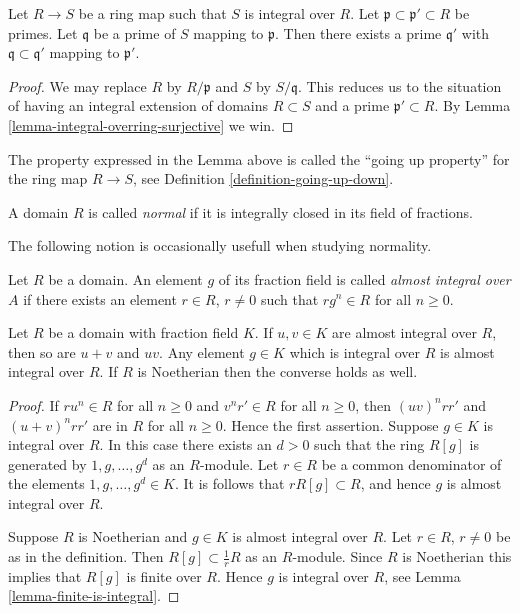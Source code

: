 \begin{lemma}
\label{lemma-integral-going-up}
Let $R \to S$ be a ring map such that
$S$ is integral over $R$.
Let $\mathfrak p \subset \mathfrak p' \subset R$
be primes. Let $\mathfrak q$ be a prime of $S$ mapping
to $\mathfrak p$. Then there exists a prime $\mathfrak q'$
with $\mathfrak q \subset \mathfrak q'$
mapping to $\mathfrak p'$.
\end{lemma}

\begin{proof}
We may replace $R$ by $R/\mathfrak p$ and $S$ by $S/\mathfrak q$.
This reduces us to the situation of having an integral
extension of domains $R \subset S$ and a prime $\mathfrak p' \subset R$.
By Lemma \ref{lemma-integral-overring-surjective} we win.
\end{proof}

\noindent
The property expressed in the Lemma above is called
the ``going up property'' for the ring map $R \to S$,
see Definition \ref{definition-going-up-down}.

\begin{definition}
\label{definition-ring-normal}
A domain $R$ is called {\it normal} if it is integrally
closed in its field of fractions.
\end{definition}

\noindent
The following notion is occasionally usefull when
studying normality.

\begin{definition}
\label{definition-almost-integral}
Let $R$ be a domain. An element $g$ of its fraction
field is called {\it almost integral over $A$}
if there exists an element $r \in R$, $r\not = 0$
such that $rg^n \in R$ for all $n \geq 0$.
\end{definition}

\begin{lemma}
\label{lemma-almost-integral}
Let $R$ be a domain with fraction field $K$.
If $u, v \in K$ are almost integral over $R$, then so are
$u + v$ and $uv$. Any element $g \in K$ which is integral over $R$
is almost integral over $R$. If $R$ is Noetherian
then the converse holds as well.
\end{lemma}

\begin{proof}
If $ru^n \in R$ for all $n \geq 0$ and
$v^nr' \in R$ for all $n \geq 0$, then
$(uv)^nrr'$ and $(u + v)^nrr'$ are in $R$ for
all $n \geq 0$. Hence the first assertion.
Suppose $g \in K$ is integral over $R$.
In this case there exists an $d > 0$ such that
the ring $R[g]$ is generated by $1, g, \ldots, g^d$ as an $R$-module.
Let $r \in R$ be a common denominator of the elements
$1, g, \ldots, g^d \in K$. It is follows that $rR[g] \subset R$,
and hence $g$ is almost integral over $R$.

\medskip\noindent
Suppose $R$ is Noetherian and $g \in K$ is almost integral over $R$.
Let $r \in R$, $r\not= 0$ be as in the definition.
Then $R[g] \subset \frac{1}{r}R$ as an $R$-module.
Since $R$ is Noetherian this implies that $R[g]$ is
finite over $R$. Hence $g$ is integral over $R$, see
Lemma \ref{lemma-finite-is-integral}.
\end{proof}

